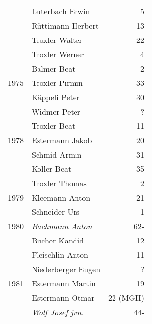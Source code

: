 {\begin{longtable}{ l l r }
                      & Luterbach Erwin                           & 5           \\
                      & Rüttimann Herbert                         & 13          \\
                      & Troxler Walter                            & 22          \\
                      & Troxler Werner                            & 4           \\
                      & Balmer Beat                               & 2           \\
        1975          & Troxler Pirmin                            & 33          \\
                      & Käppeli Peter                             & 30          \\
                      & Widmer Peter                              & ?           \\
                      & Troxler Beat                              & 11          \\
        1978          & Estermann Jakob                           & 20          \\
                      & Schmid Armin                              & 31          \\
                      & Koller Beat                               & 35          \\
                      & Troxler Thomas                            & 2           \\
        1979          & Kleemann Anton                            & 21          \\
                      & Schneider Urs                             & 1           \\
        1980          & \emph{Bachmann Anton}                     & 62-         \\
                      & Bucher Kandid                             & 12          \\
                      & Fleischlin Anton                          & 11          \\
                      & Niederberger Eugen                        & ?           \\
        1981          & Estermann Martin                          & 19          \\
                      & Estermann Otmar                           & 22 (MGH)    \\
                      & \emph{Wolf Josef jun.}                    & 44-         \\

\end{longtable}}

